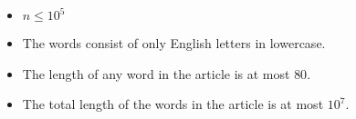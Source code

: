 \begin{itemize}
	\tightlist
	\item $n \le 10^5$
    \item The words consist of only English letters in lowercase.
    \item The length of any word in the article is at most $80$.
	\item The total length of the words in the article is at most $10^7$.
\end{itemize}

